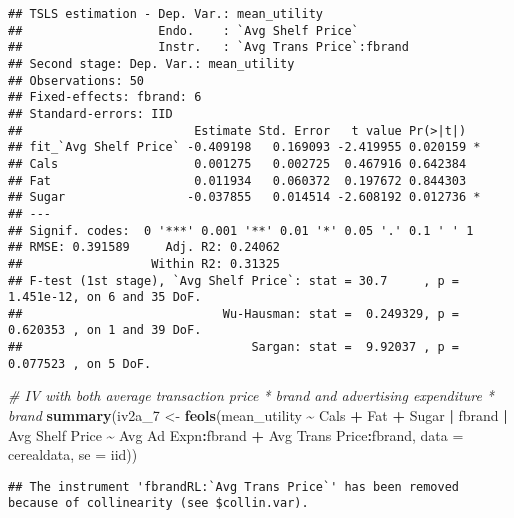 \documentclass[
]{article}
\newenvironment{Shaded}{\begin{snugshade}}{\end{snugshade}}
\newcommand{\AttributeTok}[1]{\textcolor[rgb]{0.13,0.29,0.53}{#1}}
\newcommand{\CommentTok}[1]{\textcolor[rgb]{0.56,0.35,0.01}{\textit{#1}}}
\newcommand{\FunctionTok}[1]{\textcolor[rgb]{0.13,0.29,0.53}{\textbf{#1}}}
\newcommand{\NormalTok}[1]{#1}
\newcommand{\OtherTok}[1]{\textcolor[rgb]{0.56,0.35,0.01}{#1}}
\newcommand{\SpecialCharTok}[1]{\textcolor[rgb]{0.81,0.36,0.00}{\textbf{#1}}}
\newcommand{\StringTok}[1]{\textcolor[rgb]{0.31,0.60,0.02}{#1}}
\begin{document}
\begin{verbatim}
## TSLS estimation - Dep. Var.: mean_utility
##                   Endo.    : `Avg Shelf Price`
##                   Instr.   : `Avg Trans Price`:fbrand
## Second stage: Dep. Var.: mean_utility
## Observations: 50
## Fixed-effects: fbrand: 6
## Standard-errors: IID 
##                        Estimate Std. Error   t value Pr(>|t|)    
## fit_`Avg Shelf Price` -0.409198   0.169093 -2.419955 0.020159 *  
## Cals                   0.001275   0.002725  0.467916 0.642384    
## Fat                    0.011934   0.060372  0.197672 0.844303    
## Sugar                 -0.037855   0.014514 -2.608192 0.012736 *  
## ---
## Signif. codes:  0 '***' 0.001 '**' 0.01 '*' 0.05 '.' 0.1 ' ' 1
## RMSE: 0.391589     Adj. R2: 0.24062
##                  Within R2: 0.31325
## F-test (1st stage), `Avg Shelf Price`: stat = 30.7     , p = 1.451e-12, on 6 and 35 DoF.
##                            Wu-Hausman: stat =  0.249329, p = 0.620353 , on 1 and 39 DoF.
##                                Sargan: stat =  9.92037 , p = 0.077523 , on 5 DoF.
\end{verbatim}

\begin{Shaded}
\begin{Highlighting}[]
\CommentTok{\#  IV with both  average transaction price * brand and advertising expenditure * brand}
\FunctionTok{summary}\NormalTok{(iv2a\_7 }\OtherTok{\textless{}{-}} \FunctionTok{feols}\NormalTok{(mean\_utility }\SpecialCharTok{\textasciitilde{}}\NormalTok{ Cals }\SpecialCharTok{+}\NormalTok{ Fat }\SpecialCharTok{+}\NormalTok{ Sugar }\SpecialCharTok{|}\NormalTok{ fbrand }\SpecialCharTok{|}
                               \StringTok{\textasciigrave{}}\AttributeTok{Avg Shelf Price}\StringTok{\textasciigrave{}} \SpecialCharTok{\textasciitilde{}} \StringTok{\textasciigrave{}}\AttributeTok{Avg Ad Expn}\StringTok{\textasciigrave{}}\SpecialCharTok{:}\NormalTok{fbrand }\SpecialCharTok{+} \StringTok{\textasciigrave{}}\AttributeTok{Avg Trans Price}\StringTok{\textasciigrave{}}\SpecialCharTok{:}\NormalTok{fbrand,}
                             \AttributeTok{data =}\NormalTok{ cerealdata, }\AttributeTok{se =} \StringTok{\textquotesingle{}iid\textquotesingle{}}\NormalTok{))}
\end{Highlighting}
\end{Shaded}

\begin{verbatim}
## The instrument 'fbrandRL:`Avg Trans Price`' has been removed because of collinearity (see $collin.var).
\end{verbatim}
\end{document}
